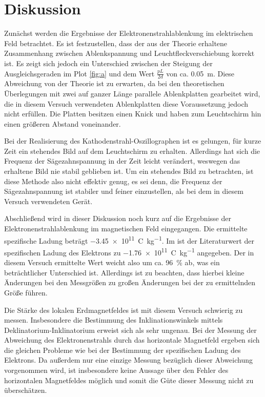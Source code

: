 
\section{Diskussion}
Zunächst werden die Ergebnisse der Elektronenstrahlablenkung im
elektrischen Feld betrachtet. Es ist festzustellen, dass der aus der
Theorie erhaltene Zusammenhang zwischen Ablenkspannung und
Leuchtfleckverschiebung korrekt ist. Es zeigt sich jedoch ein
Unterschied zwischen der Steigung der Ausgleichsgeraden im Plot
\ref{fig:a} und dem Wert $\frac{pL}{2d}$ von
ca. \SI{0.05}{\metre}. Diese Abweichung von der Theorie ist zu erwarten,
da bei den theoretischen Überlegungen mit zwei auf ganzer Länge
parallele Ablenkplatten gearbeitet wird, die in diesem Versuch
verwendeten Ablenkplatten diese Voraussetzung jedoch nicht erfüllen. Die
Platten besitzen einen Knick und haben zum Leuchtschirm hin einen
größeren Abstand voneinander.

Bei der Realisierung des Kathodenstrahl-Oszillographen ist es gelungen,
für kurze Zeit ein stehendes Bild auf dem Leuchtschirm zu
erhalten. Allerdings hat sich die Frequenz der Sägezahnspannung in der
Zeit leicht verändert, weswegen das erhaltene Bild nie stabil geblieben
ist. Um ein stehendes Bild zu betrachten, ist diese Methode also nicht
effektiv genug, es sei denn, die Frequenz der Sägezahnspannung ist
stabiler und feiner einzustellen, als bei dem in diesem Versuch
verwendeten Gerät.

Abschließend wird in dieser Diskussion noch kurz auf die Ergebnisse der
Elektronenstrahlablenkung im magnetischen Feld eingegangen. Die
ermittelte spezifische Ladung beträgt
\SI{-3.45e11}{\coulomb\per\kilo\gram}. Im \textcite{demtroeder-1} ist
der Literaturwert der spezifischen Ladung des Elektrons zu
\SI{-1.76e11}{\coulomb\per\kilo\gram} angegeben. Der in diesem Versuch
ermittelte Wert weicht also um ca. \SI{96}{\percent} ab, was ein
beträchtlicher Unterschied ist. Allerdings ist zu beachten, dass hierbei
kleine Änderungen bei den Messgrößen zu großen Änderungen bei der zu
ermittelnden Größe führen.

Die Stärke des lokalen Erdmagnetfeldes ist mit diesem Versuch schwierig
zu messen. Insbesondere die Bestimmung des Inklinationswinkels mittels
Deklinatorium-Inklinatorium erweist sich als sehr ungenau. Bei der
Messung der Abweichung des Elektronenstrahls durch das horizontale
Magnetfeld ergeben sich die gleichen Probleme wie bei der Bestimmung der
spezifischen Ladung des Elektrons. Da außerdem nur eine einzige Messung
bezüglich dieser Abweichung vorgenommen wird, ist insbesondere keine
Aussage über den Fehler des horizontalen Magnetfeldes möglich und somit
die Güte dieser Messung nicht zu überschätzen.

